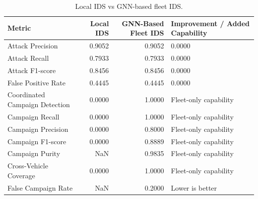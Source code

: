 \begin{table}[t]
\centering
\begin{tabular}{lrrl}
\toprule
Metric & Local IDS & GNN-Based Fleet IDS & Improvement / Added Capability \\
\midrule
Attack Precision & 0.9052 & 0.9052 & 0.0000 \\
Attack Recall & 0.7933 & 0.7933 & 0.0000 \\
Attack F1-score & 0.8456 & 0.8456 & 0.0000 \\
False Positive Rate & 0.4445 & 0.4445 & 0.0000 \\
Coordinated Campaign Detection & 0.0000 & 1.0000 & Fleet-only capability \\
Campaign Recall & 0.0000 & 1.0000 & Fleet-only capability \\
Campaign Precision & 0.0000 & 0.8000 & Fleet-only capability \\
Campaign F1-score & 0.0000 & 0.8889 & Fleet-only capability \\
Campaign Purity & NaN & 0.9835 & Fleet-only capability \\
Cross-Vehicle Coverage & 0.0000 & 1.0000 & Fleet-only capability \\
False Campaign Rate & NaN & 0.2000 & Lower is better \\
\bottomrule
\end{tabular}
\caption{Local IDS vs GNN-based fleet IDS.}
\label{tab:final-local-vs-gnn}
\end{table}
